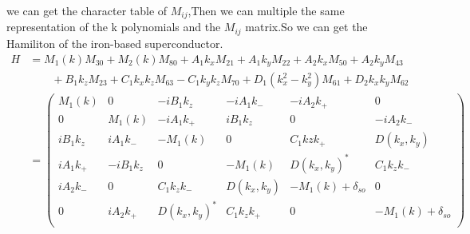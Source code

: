 \documentclass[5pt]{article}
\begin{document}
we can get the character table of $M_{ij}$,Then we can multiple the same representation of the k polynomials and the $M_{ij}$ matrix.So we can get the Hamiliton of the iron-based superconductor.
\begin{align}
	\nonumber
	H&=M_1(k)M_{30}+M_2(k)M_{80}+A_1k_xM_{21}+A_1k_yM_{22}+A_2k_xM_{50}+A_2k_yM_{43}
	\\
	\nonumber  &\qquad +B_1k_zM_{23}+C_1k_xk_zM_{63}-C_1k_yk_zM_{70}+D_1(k_x^2-k_y^2)M_{61}+D_2k_xk_yM_{62}\\
	&=	\begin{pmatrix}
		M_1(k)      &     0        &   -iB_1k_z        &   -iA_1k_{-}     &   -iA_2k_{+}    &0\\
		0  &     M_1(k)      &  -iA_1k_{+}    &   iB_1k_z       &     0     & -iA_2k_{-}\\
		iB_1k_z    &   iA_1k_{-}      &    -M_1(k)        & 0     &   C_1kzk_{+} &D(k_x,k_y)\\
		iA_1k_{+}    &   -iB_1k_z    &   0  &   -M_1(k)    & D(k_x,k_y)^{*} &C_1k_zk_{-}\\
		iA_2k_{-}  &        0    &    C_1k_zk_{-}    &    D(k_x,k_y)      &      -M_1(k)+\delta_{so}      &0\\
		0&      iA_2k_{+}      &   D(k_x,k_y)^{*}    &   C_1k_zk_{+}       &    0      & -M_1(k)+\delta_{so} \\
	\end{pmatrix}
\end{align}	
\end{document}
